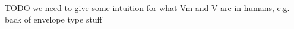 \documentclass[11pt]{article}
\newcommand{\V}{\text{V}}
\begin{document}
TODO we need to give some intuition for what Vm and V are in humans, e.g. back of envelope type stuff





















\end{document}
